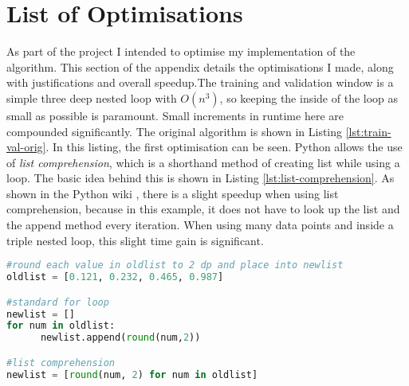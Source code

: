 \documentclass[ oneside,%
                    author={Joshua Felmeden},
                    degree={MEng},
                     title={Sentiment Analysis of Financial Headlines Based on Stock Returns},
                  subtitle={Research}]{dissertation}
\begin{document}


\chapter{List of Optimisations}
\label{appx:optimisations}
As part of the project I intended to optimise my implementation of the algorithm. This section of the appendix details the optimisations I made, along with justifications and overall speedup.The training and validation window is a simple three deep nested loop with $O(n^3)$, so keeping the inside of the loop as small as possible is paramount. Small increments in runtime here are compounded significantly. The original algorithm is shown in Listing \ref{lst:train-val-orig}. In this listing, the first optimisation can be seen. Python allows the use of \textit{list comprehension}, which is a shorthand method of creating list while using a loop. The basic idea behind this is shown in Listing \ref{lst:list-comprehension}. As shown in the Python wiki \cite{list-comprehension}, there is a slight speedup when using list comprehension, because in this example, it does not have to look up the list and the append method every iteration. When using many data points and inside a triple nested loop, this slight time gain is significant.

\begin{lstlisting}[float={!htb},caption={List comprehension example},label={lst:list-comprehension},language=Python]
#round each value in oldlist to 2 dp and place into newlist
oldlist = [0.121, 0.232, 0.465, 0.987]

#standard for loop
newlist = []
for num in oldlist:
      newlist.append(round(num,2))

#list comprehension
newlist = [round(num, 2) for num in oldlist]
\end{lstlisting}
\end{document}
